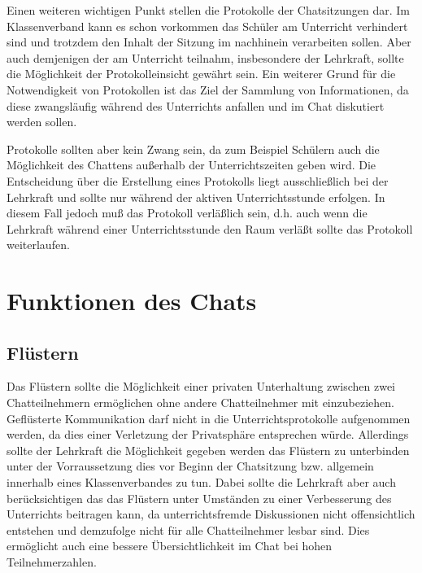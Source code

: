 Einen weiteren wichtigen Punkt stellen die Protokolle der Chatsitzungen dar. Im Klassenverband
kann es schon vorkommen das Sch\"uler am Unterricht verhindert sind und trotzdem den Inhalt
der Sitzung im nachhinein verarbeiten sollen. Aber auch demjenigen der am Unterricht teilnahm,
insbesondere der Lehrkraft, sollte die M\"oglichkeit der Protokolleinsicht gew\"ahrt sein. Ein
weiterer Grund f\"ur die Notwendigkeit von Protokollen ist das Ziel der Sammlung von Informationen,
da diese zwangsl\"aufig w\"ahrend des Unterrichts anfallen und im Chat diskutiert werden sollen.

Protokolle sollten aber kein Zwang sein, da zum Beispiel Sch\"ulern auch die M\"oglichkeit des 
Chattens au{\ss}erhalb der Unterrichtszeiten geben wird. Die Entscheidung \"uber die Erstellung 
eines Protokolls liegt ausschlie{\ss}lich bei der Lehrkraft und sollte nur w\"ahrend der aktiven 
Unterrichtsstunde erfolgen. In diesem Fall jedoch mu{\ss} das Protokoll verl\"a{\ss}lich sein, d.h.
auch wenn die Lehrkraft w\"ahrend einer Unterrichtsstunde den Raum verl\"a{\ss}t sollte das Protokoll 
weiterlaufen.



\section{Funktionen des Chats}

\subsection{Fl\"ustern}

Das Fl\"ustern sollte die M\"oglichkeit einer privaten Unterhaltung zwischen zwei Chatteilnehmern
erm\"oglichen ohne andere Chatteilnehmer mit einzubeziehen. Gefl\"usterte Kommunikation darf nicht
in die Unterrichtsprotokolle aufgenommen werden, da dies einer Verletzung der Privatsph\"are 
entsprechen w\"urde. Allerdings sollte der Lehrkraft die M\"oglichkeit gegeben werden das Fl\"ustern
zu unterbinden unter der Vorraussetzung dies vor Beginn der Chatsitzung bzw. allgemein innerhalb
eines Klassenverbandes zu tun. Dabei sollte die Lehrkraft aber auch ber\"ucksichtigen das das
Fl\"ustern unter Umst\"anden zu einer Verbesserung des Unterrichts beitragen kann, da unterrichtsfremde
Diskussionen nicht offensichtlich entstehen und demzufolge nicht f\"ur alle Chatteilnehmer lesbar
sind. Dies erm\"oglicht auch eine bessere \"Ubersichtlichkeit im Chat bei hohen Teilnehmerzahlen.


